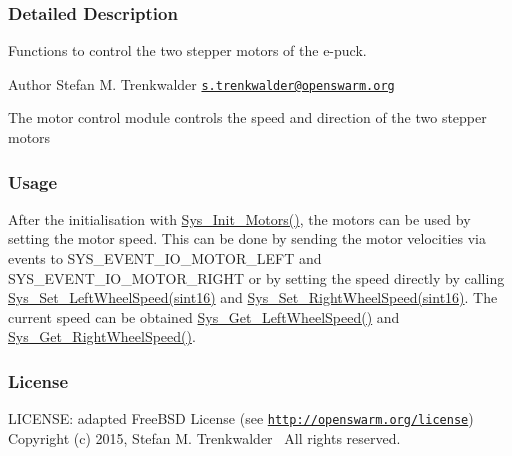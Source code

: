 \subsubsection{Detailed Description}
Functions to control the two stepper motors of the e-\/puck. 

\begin{DoxyAuthor}{Author}
Stefan M. Trenkwalder \href{mailto:s.trenkwalder@openswarm.org}{\tt s.\+trenkwalder@openswarm.\+org}
\end{DoxyAuthor}
The motor control module controls the speed and direction of the two stepper motors\hypertarget{group__motors_motors_usage}{}\subsubsection{Usage}\label{group__motors_motors_usage}
After the initialisation with \hyperlink{motors_8h_ab35833b8a72da88c16285b4ff4d24eb5}{Sys\+\_\+\+Init\+\_\+\+Motors()}, the motors can be used by setting the motor speed. This can be done by sending the motor velocities via events to S\+Y\+S\+\_\+\+E\+V\+E\+N\+T\+\_\+\+I\+O\+\_\+\+M\+O\+T\+O\+R\+\_\+\+L\+E\+F\+T and S\+Y\+S\+\_\+\+E\+V\+E\+N\+T\+\_\+\+I\+O\+\_\+\+M\+O\+T\+O\+R\+\_\+\+R\+I\+G\+H\+T or by setting the speed directly by calling \hyperlink{motors_8h_a3bd56e9540443f08d15bdef558e77dd5}{Sys\+\_\+\+Set\+\_\+\+Left\+Wheel\+Speed(sint16)} and \hyperlink{motors_8h_a497d00bbd91ce1308c6e6d15d16b482d}{Sys\+\_\+\+Set\+\_\+\+Right\+Wheel\+Speed(sint16)}. The current speed can be obtained \hyperlink{motors_8h_a5bbad23cd0753c64c8e265434acbf954}{Sys\+\_\+\+Get\+\_\+\+Left\+Wheel\+Speed()} and \hyperlink{motors_8h_af1bbe9f3268a03f3a75e1c39296794e9}{Sys\+\_\+\+Get\+\_\+\+Right\+Wheel\+Speed()}.\hypertarget{group__motors_motors_license}{}\subsubsection{License}\label{group__motors_motors_license}
L\+I\+C\+E\+N\+S\+E\+: adapted Free\+B\+S\+D License (see \href{http://openswarm.org/license}{\tt http\+://openswarm.\+org/license})~\newline
Copyright (c) 2015, Stefan M. Trenkwalder~\newline
All rights reserved. 